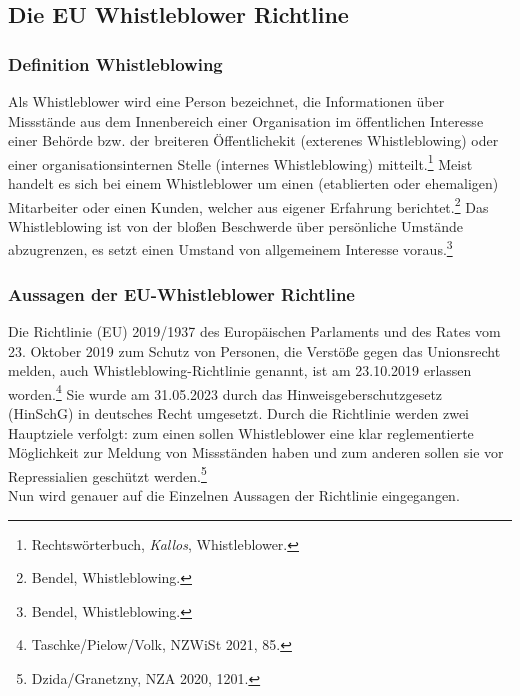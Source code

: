 \subsection{Die EU Whistleblower Richtline}
\label{sec:Teilkapitel}

\subsubsection{Definition Whistleblowing}
Als Whistleblower wird eine Person bezeichnet, die Informationen über Missstände aus dem Innenbereich einer Organisation im öffentlichen Interesse einer Behörde bzw.  der breiteren Öffentlichekit (exterenes Whistleblowing) oder einer organisationsinternen Stelle (internes Whistleblowing) mitteilt.\footnote{Rechtswörterbuch, \textit{Kallos}, Whistleblower.} 
Meist handelt es sich bei einem Whistleblower um einen (etablierten oder ehemaligen) Mitarbeiter oder einen Kunden, welcher aus eigener Erfahrung berichtet.\footnote{Bendel, Whistleblowing.}
Das Whistleblowing ist von der bloßen Beschwerde über persönliche Umstände abzugrenzen, es setzt einen Umstand von allgemeinem Interesse voraus.\footnote{Bendel, Whistleblowing.}


\subsubsection{Aussagen der EU-Whistleblower Richtline}

Die Richtlinie (EU) 2019/1937 des Europäischen Parlaments und des Rates vom 23. Oktober 2019 zum Schutz von Personen, die Verstöße gegen das Unionsrecht melden, auch Whistleblowing-Richtlinie genannt, ist am 23.10.2019 erlassen worden.\footnote{Taschke/Pielow/Volk, NZWiSt 2021, 85.}
Sie wurde am 31.05.2023 durch das Hinweisgeberschutzgesetz (HinSchG) in deutsches Recht umgesetzt.
Durch die Richtlinie werden zwei Hauptziele verfolgt: zum einen sollen Whistleblower eine klar reglementierte Möglichkeit zur Meldung von Missständen haben und zum anderen sollen sie vor Repressialien geschützt werden.\footnote{Dzida/Granetzny, NZA 2020, 1201.}\\
Nun wird genauer auf die Einzelnen Aussagen der Richtlinie eingegangen.

